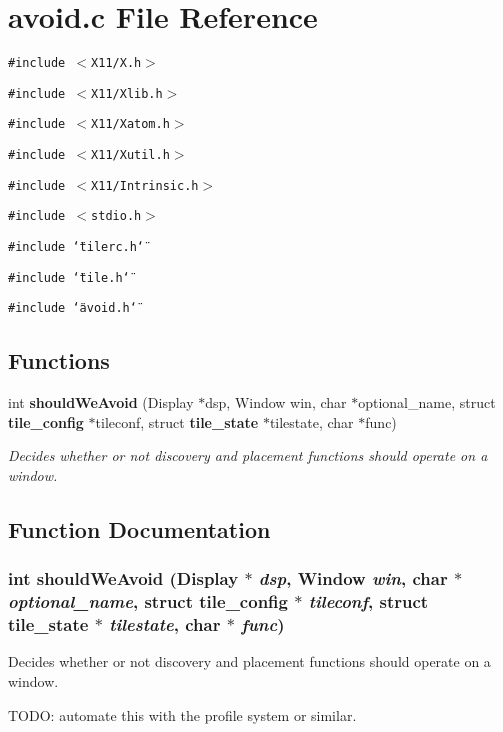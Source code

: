 \section{avoid.c File Reference}
\label{avoid_8c}
{\tt \#include $<$X11/X.h$>$}\par
{\tt \#include $<$X11/Xlib.h$>$}\par
{\tt \#include $<$X11/Xatom.h$>$}\par
{\tt \#include $<$X11/Xutil.h$>$}\par
{\tt \#include $<$X11/Intrinsic.h$>$}\par
{\tt \#include $<$stdio.h$>$}\par
{\tt \#include \char`\"{}tilerc.h\char`\"{}}\par
{\tt \#include \char`\"{}tile.h\char`\"{}}\par
{\tt \#include \char`\"{}avoid.h\char`\"{}}\par
\subsection*{Functions}
\begin{CompactItemize}
\item 
int {\bf should\-We\-Avoid} (Display $\ast$dsp, Window win, char $\ast$optional\_\-name, struct {\bf tile\_\-config} $\ast$tileconf, struct {\bf tile\_\-state} $\ast$tilestate, char $\ast$func)
\begin{CompactList}\small\item\em Decides whether or not discovery and placement functions should operate on a window. \item\end{CompactList}\end{CompactItemize}


\subsection{Function Documentation}
\subsubsection{\setlength{\rightskip}{0pt plus 5cm}int should\-We\-Avoid (Display $\ast$ {\em dsp}, Window {\em win}, char $\ast$ {\em optional\_\-name}, struct {\bf tile\_\-config} $\ast$ {\em tileconf}, struct {\bf tile\_\-state} $\ast$ {\em tilestate}, char $\ast$ {\em func})}\label{avoid_8c_a0}


Decides whether or not discovery and placement functions should operate on a window. 

TODO: automate this with the profile system or similar. 